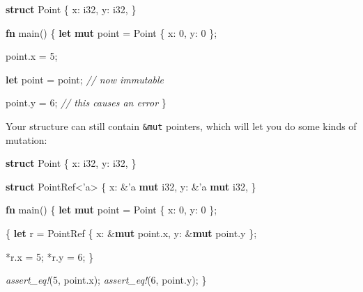 \documentclass[a4paper,]{book}
\newenvironment{Shaded}{\begin{snugshade}}{\end{snugshade}}
\newcommand{\KeywordTok}[1]{\textcolor[rgb]{0.13,0.29,0.53}{\textbf{{#1}}}}
\newcommand{\DataTypeTok}[1]{\textcolor[rgb]{0.13,0.29,0.53}{{#1}}}
\newcommand{\DecValTok}[1]{\textcolor[rgb]{0.00,0.00,0.81}{{#1}}}
\newcommand{\CommentTok}[1]{\textcolor[rgb]{0.56,0.35,0.01}{\textit{{#1}}}}
\newcommand{\OtherTok}[1]{\textcolor[rgb]{0.56,0.35,0.01}{{#1}}}
\newcommand{\PreprocessorTok}[1]{\textcolor[rgb]{0.56,0.35,0.01}{\textit{{#1}}}}
\newcommand{\NormalTok}[1]{{#1}}
\begin{document}
\begin{Shaded}
\begin{Highlighting}[]
\KeywordTok{struct} \NormalTok{Point \{}
    \NormalTok{x: }\DataTypeTok{i32}\NormalTok{,}
    \NormalTok{y: }\DataTypeTok{i32}\NormalTok{,}
\NormalTok{\}}

\KeywordTok{fn} \NormalTok{main() \{}
    \KeywordTok{let} \KeywordTok{mut} \NormalTok{point = Point \{ x: }\DecValTok{0}\NormalTok{, y: }\DecValTok{0} \NormalTok{\};}

    \NormalTok{point.x = }\DecValTok{5}\NormalTok{;}

    \KeywordTok{let} \NormalTok{point = point; }\CommentTok{// now immutable}

    \NormalTok{point.y = }\DecValTok{6}\NormalTok{; }\CommentTok{// this causes an error}
\NormalTok{\}}
\end{Highlighting}
\end{Shaded}

Your structure can still contain \texttt{\&mut} pointers, which will let
you do some kinds of mutation:

\begin{Shaded}
\begin{Highlighting}[]
\KeywordTok{struct} \NormalTok{Point \{}
    \NormalTok{x: }\DataTypeTok{i32}\NormalTok{,}
    \NormalTok{y: }\DataTypeTok{i32}\NormalTok{,}
\NormalTok{\}}

\KeywordTok{struct} \NormalTok{PointRef<}\OtherTok{'a}\NormalTok{> \{}
    \NormalTok{x: &}\OtherTok{'a} \KeywordTok{mut} \DataTypeTok{i32}\NormalTok{,}
    \NormalTok{y: &}\OtherTok{'a} \KeywordTok{mut} \DataTypeTok{i32}\NormalTok{,}
\NormalTok{\}}

\KeywordTok{fn} \NormalTok{main() \{}
    \KeywordTok{let} \KeywordTok{mut} \NormalTok{point = Point \{ x: }\DecValTok{0}\NormalTok{, y: }\DecValTok{0} \NormalTok{\};}

    \NormalTok{\{}
        \KeywordTok{let} \NormalTok{r = PointRef \{ x: &}\KeywordTok{mut} \NormalTok{point.x, y: &}\KeywordTok{mut} \NormalTok{point.y \};}

        \NormalTok{*r.x = }\DecValTok{5}\NormalTok{;}
        \NormalTok{*r.y = }\DecValTok{6}\NormalTok{;}
    \NormalTok{\}}

    \PreprocessorTok{assert_eq!}\NormalTok{(}\DecValTok{5}\NormalTok{, point.x);}
    \PreprocessorTok{assert_eq!}\NormalTok{(}\DecValTok{6}\NormalTok{, point.y);}
\NormalTok{\}}
\end{Highlighting}
\end{Shaded}
\end{document}
